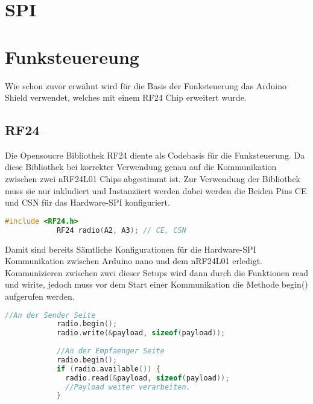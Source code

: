 \documentclass{article}
\begin{document}
\newpage    
\section{SPI}%

\newpage
\section{Funksteuereung} %
    Wie schon zuvor erwähnt wird für die Basis der Funksteuerung das Arduino Shield verwendet, welches mit einem RF24 Chip erweitert wurde.
    \subsection{RF24} %
       Die Opensoucre Bibliothek RF24 \cite{RF24_Lib} diente als Codebasis für die Funksteuerung. Da diese Bibliothek bei korrekter Verwendung genau auf die Kommunikation zwischen zwei nRF24L01 Chips abgestimmt ist.
       Zur Verwendung der Bibliothek muss sie nur inkludiert und Instanziiert werden dabei werden die Beiden Pins CE und CSN für das Hardware-SPI konfiguriert.
       
       \begin{file}[RF24 initialisieren]
        \begin{lstlisting}[language=C++]
            #include <RF24.h>
            RF24 radio(A2, A3); // CE, CSN
        \end{lstlisting}
        \end{file}
        
        Damit sind bereits Sämtliche Konfigurationen für die Hardware-SPI Kommunikation zwischen Arduino nano und dem nRF24L01 erledigt.
        Kommunizieren zwischen zwei dieser Setups wird dann durch die Funktionen read und wirite, jedoch muss vor dem Start einer Kommunikation die Methode begin() aufgerufen werden.
       \begin{file}[RF24 initialisieren]
        \begin{lstlisting}[language=C++]
            //An der Sender Seite
            radio.begin();
            radio.write(&payload, sizeof(payload));
            
            //An der Empfaenger Seite
            radio.begin();
            if (radio.available()) {
              radio.read(&payload, sizeof(payload));
              //Payload weiter verarbeiten.
            }
        \end{lstlisting}
        \end{file} 
        
\end{document}
